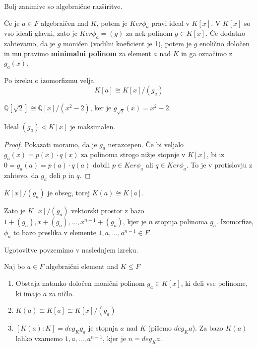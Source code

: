 \documentclass[11pt, a4paper]{article}
\begin{document}
    Bolj zanimive so algebraične razširitve.
    \par
    Če je \(a \in F\) algebraičen nad \(K\), potem je \(Ker \phi_a\) pravi ideal v \(K[x]\). V \(K[x]\) so vso ideali glavni, zato je \(Ker \phi_a = (g)\) za nek polinom \(g \in K[x]\). Če dodatno zahtevamo, da je \(g\) moničen (vodilni koeficient je 1), potem je \(g\) enolično določen in mu pravimo \textbf{minimalni polinom} za element \(a\) nad \(K\) in ga označimo z \(g_a(x)\).

    \par
    Po izreku o izomorfizmu velja
    \[K[a] \cong K[x] / (g_a)\]

    \begin{example}
        \(\mathbb{Q}[\sqrt{2}] \cong \mathbb{Q}[x] / (x^2-2)\), ker je \(g_{\sqrt{2}}(x) = x^2-2\).
    \end{example}

    \begin{lemma}
        Ideal \((g_a) \triangleleft K[x]\) je maksimalen.
    \end{lemma}

    \begin{proof}
        Pokazati moramo, da je \(g_a\) nerazcepen. Če bi veljalo \(g_a(x) = p(x) \cdot q(x)\) za polinoma strogo nižje stopnje v \(K[x]\), bi iz \(0 = g_a(a) = p(a) \cdot q(a)\) dobili \(p \in Ker \phi_a\) ali \(q \in Ker \phi_a\). To je v protislovju z zahtevo, da \(g_a\) deli \(p\) in \(q\).
    \end{proof}

    \begin{corollary}
        \(K[x] / (g_a)\) je obseg, torej \(K(a) \cong K[a]\).
    \end{corollary}

    Zato je \(K[x] / (g_a)\) vektorski prostor z bazo \(1 + (g_a), x + (g_a),..., x^{n-1} + (g_a)\), kjer je \(n\) stopnja polinoma \(g_a\). Izomorfize, \(\overline{\phi_a}\) to bazo preslika v elemente \(1,a,...,a^{n-1} \in F\).

    \par
    Ugotovitve povzemimo v naslednjem izreku.

    \begin{theorem}
        Naj bo \(a \in F\) algebraični element nad \(K \le F\)
        \begin{enumerate}[label=\alph*)]
            \item Obstaja natanko določen monični polinom \(g_a \in K[x]\), ki deli vse polinome, ki imajo \(a\) za ničlo.
            \item \(K(a) \cong K[a] \cong K[x] / (g_a)\)
            \item \([K(a) : K] = deg_{K} g_a\) je stopnja \(a\) nad \(K\) (pišemo \(deg_{K} a\)). Za bazo \(K(a)\) lahko vzamemo \(1,a,...,a^{n-1}\), kjer je \(n = deg_{K} a\).
        \end{enumerate}    
    \end{theorem}
\end{document}
